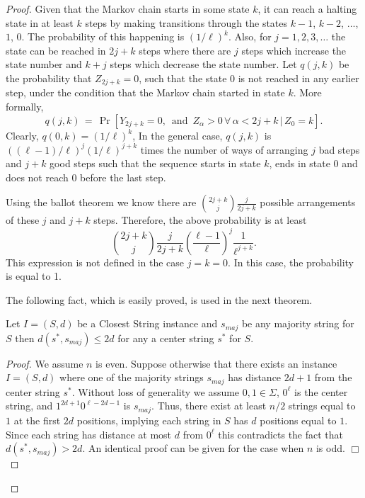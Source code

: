 \begin{proof}
Given that the Markov chain starts in some state $k$, it can reach a halting state in at least $k$ steps by making transitions through the states $k - 1$, $k - 2$, $\ldots$, $1$, $0$.  The probability of this happening is $(1/\ell)^k$.  Also, for $j = 1, 2, 3, \ldots$ the state can be reached in $2j + k$ steps where there are $j$ steps which increase the state number and $k + j$  steps which decrease the state number.  Let $q(j,k)$ be the probability that $Z_{2j + k} = 0$, such that the state 0 is not reached  in any earlier step, under the condition that the Markov chain started in state $k$.  More formally,  $$q(j, k) \, =  \, \Pr[Y_{2j+k} = 0, \, \mbox{ and } \, Z_{\alpha} > 0 \, \forall \, \alpha < 2j + k \, | \, Z_0 = k ].$$ Clearly, $q(0, k) = (1/\ell)^k$,  In the general case, $q(j, k)$ is $((\ell - 1)/\ell)^j (1/\ell)^{j + k}$ times the number of ways of arranging $j$ bad steps and $j + k$ good steps such that the sequence starts in state $k$, ends in state 0 and does not reach 0 before the last step. 

Using the ballot theorem \cite{ballot_thm} we know there are ${{2j + k}\choose{j}}\frac{j}{2j +k}$ possible arrangements of these $j$ and $j + k$ steps. Therefore, the above probability is at least $${{2j + k}\choose{j}}\frac{j}{2j +k} \left( \frac{\ell - 1}{\ell}\right)^{j} \frac{1}{\ell^{j + k}}.$$ This expression is not defined in the case $j = k = 0$.  In this case, the probability is equal to 1.   

The following fact, which is easily proved, is used in the next theorem.  

\begin{fact} \label{fact2} Let $I = (S, d)$ be a {\sc Closest String} instance and $s_{maj}$ be any majority string for $S$ then $d(s^*, s_{maj}) \leq 2d$ for any a center string $s^*$ for $S$.  \end{fact}

\begin{proof} We assume $n$ is even. Suppose otherwise that there exists an instance $I = (S, d)$ where one of the majority strings $s_{maj}$ has distance $2d + 1$ from the center string $s^*$.  Without loss of generality we assume $0, 1 \in \Sigma$, $0^{\ell}$ is the center string, and $1^{2d + 1}0^{\ell - 2d - 1}$ is $s_{maj}$.  Thus, there exist at least $n/2$ strings equal to $1$ at the first $2d$ positions, implying each string in $S$ has $d$ positions equal to $1$.   Since each string has distance at most $d$ from $0^{\ell}$ this contradicts the fact that $d(s^*, s_{maj}) > 2d$.   An identical proof can be given for the case when $n$ is odd.  \hfill $\Box$ \end{proof} 


\end{proof}
